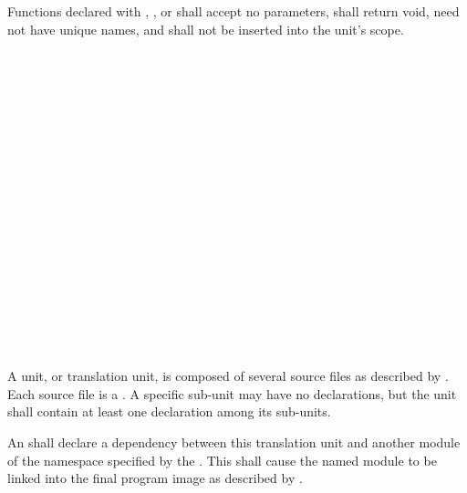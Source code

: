 \specsubsubitem
Functions declared with , , or 
shall accept no parameters, shall return void, need not have unique names, and
shall not be inserted into the unit's scope.


\begin{grammar}
\\
	 \\

\\
	\\
	 \\

\\
	   \terminal{;}\\
	   \terminal{::} \terminal{\{}  \terminal{\}} \terminal{;}\\
	  \terminal{::} \terminal{*} \terminal{;}\\

\\
	 \terminal{=}\\

\\
	 \optional{\terminal{,}}\\
	 \terminal{,} \\

\\
	\\
	 \terminal{=} \\
\end{grammar}

\specsubitem
A unit, or translation unit, is composed of several source files as described
by . Each source file is a .
A specific sub-unit may have no declarations, but the unit shall contain at
least one declaration among its sub-units.

\specsubitem
An  shall declare a dependency between this translation
unit and another module of the namespace specified by the
 . This shall cause the named
module to be linked into the final program image as described by
.

